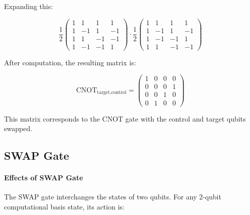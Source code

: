 Expanding this:

\[
  \frac{1}{2} \begin{pmatrix}
    1 & 1 & 1 & 1 \\
    1 & -1 & 1 & -1 \\
    1 & 1 & -1 & -1 \\
    1 & -1 & -1 & 1
    \end{pmatrix} \cdot \frac{1}{2} \begin{pmatrix}
    1 & 1 & 1 & 1 \\
    1 & -1 & 1 & -1 \\
    1 & -1 & -1 & 1 \\
    1 & 1 & -1 & -1
  \end{pmatrix}
\]

After computation, the resulting matrix is:

\[
  \text{CNOT}_{\text{target,control}} = \begin{pmatrix}
    1 & 0 & 0 & 0 \\
    0 & 0 & 0 & 1 \\
    0 & 0 & 1 & 0 \\
    0 & 1 & 0 & 0
  \end{pmatrix}
\]

This matrix corresponds to the CNOT gate with the control and target qubits
swapped.


\subsection*{SWAP Gate}



\paragraph{Effects of SWAP Gate}\label{par:Effects of SWAP Gate}
The SWAP gate interchanges the states of two qubits. For any 2-qubit
computational basis state, its action is:

